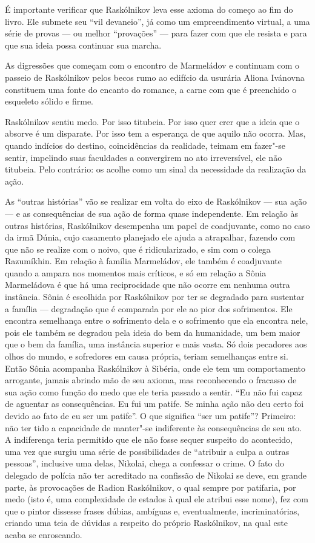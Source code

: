É importante verificar que Raskólnikov leva esse axioma do começo ao fim
do livro. Ele submete seu ``vil devaneio'', já como um empreendimento
virtual, a uma série de provas --- ou melhor ``provações'' --- para fazer
com que ele resista e para que sua ideia possa continuar sua marcha.

As digressões que começam com o encontro de Marmeládov e continuam com o
passeio de Raskólnikov pelos becos rumo ao edifício da usurária Aliona
Ivánovna constituem uma fonte do encanto do romance, a carne com que é
preenchido o esqueleto sólido e firme.

Raskólnikov sentiu medo. Por isso titubeia. Por isso quer crer que a
ideia que o absorve é um disparate. Por isso tem a esperança de que
aquilo não ocorra. Mas, quando indícios do destino, coincidências da
realidade, teimam em fazer"-se sentir, impelindo suas faculdades a
convergirem no ato irreversível, ele não titubeia. Pelo contrário: os
acolhe como um sinal da necessidade da realização da ação.

As ``outras histórias'' vão se realizar em volta do eixo de Raskólnikov
--- sua ação --- e as consequências de sua ação de forma quase
independente. Em relação às outras histórias, Raskólnikov desempenha um
papel de coadjuvante, como no caso da irmã Dúnia, cujo casamento
planejado ele ajuda a atrapalhar, fazendo com que não se realize com o
noivo, que é ridicularizado, e sim com o colega Razumíkhin. Em relação à
família Marmeládov, ele também é coadjuvante quando a ampara nos
momentos mais críticos, e só em relação a Sônia Marmeládova é que há uma
reciprocidade que não ocorre em nenhuma outra instância. Sônia é
escolhida por Raskólnikov por ter se degradado para sustentar a família
--- degradação que é comparada por ele ao pior dos sofrimentos. Ele
encontra semelhança entre o sofrimento dela e o sofrimento que ela
encontra nele, pois ele também se degradou pela ideia do bem da
humanidade, um bem maior que o bem da família, uma instância superior e
mais vasta. Só dois pecadores aos olhos do mundo, e sofredores em causa
própria, teriam semelhanças entre si. Então Sônia acompanha Raskólnikov
à Sibéria, onde ele tem um comportamento arrogante, jamais abrindo mão
de seu axioma, mas reconhecendo o fracasso de sua ação como função do
medo que ele teria passado a sentir. ``Eu não fui capaz de aguentar as
consequências. Eu fui um patife. Se minha ação não deu certo foi devido
ao fato de eu ser um patife''. O que significa ``ser um patife''?
Primeiro: não ter tido a capacidade de manter"-se indiferente às
consequências de seu ato. A indiferença teria permitido que ele não
fosse sequer suspeito do acontecido, uma vez que surgiu uma série de
possibilidades de ``atribuir a culpa a outras pessoas'', inclusive uma
delas, Nikolai, chega a confessar o crime. O fato do delegado de
polícia não ter acreditado na confissão de Nikolai se deve, em grande
parte, às provocações de Radion Raskólnikov, o qual sempre por
patifaria, por medo (isto é, uma complexidade de estados à qual ele
atribui esse nome), fez com que o pintor dissesse frases dúbias,
ambíguas e, eventualmente, incriminatórias, criando uma teia de dúvidas
a respeito do próprio Raskólnikov, na qual este acaba se enroscando.

